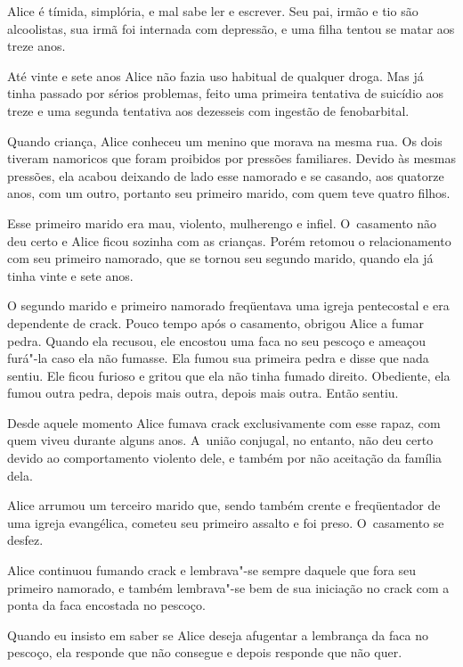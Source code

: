  

Alice é tímida, simplória, e mal sabe ler e escrever. Seu pai, irmão e
tio são alcoolistas, sua irmã foi internada com depressão, e uma filha
tentou se matar aos treze anos.

Até vinte e sete anos Alice não fazia uso habitual de qualquer droga.
Mas já tinha passado por sérios problemas, feito uma primeira tentativa
de suicídio aos treze e uma segunda tentativa aos dezesseis com ingestão
de fenobarbital.

Quando criança, Alice conheceu um menino que morava na mesma rua. Os
dois tiveram namoricos que foram proibidos por pressões familiares.
Devido às mesmas pressões, ela acabou deixando de lado esse namorado e
se casando, aos quatorze anos, com um outro, portanto seu primeiro
marido, com quem teve quatro filhos.

Esse primeiro marido era mau, violento, mulherengo e infiel. O~casamento
não deu certo e Alice ficou sozinha com as crianças. Porém retomou o
relacionamento com seu primeiro namorado, que se tornou seu segundo
marido, quando ela já tinha vinte e sete anos.

O segundo marido e primeiro namorado freqüentava uma igreja pentecostal
e era dependente de crack. Pouco tempo após o casamento, obrigou Alice a
fumar pedra. Quando ela recusou, ele encostou uma faca no seu pescoço e
ameaçou furá"-la caso ela não fumasse. Ela fumou sua primeira pedra e
disse que nada sentiu. Ele ficou furioso e gritou que ela não tinha
fumado direito. Obediente, ela fumou outra pedra, depois mais outra,
depois mais outra. Então sentiu.

Desde aquele momento Alice fumava crack exclusivamente com esse rapaz,
com quem viveu durante alguns anos. A~união conjugal, no entanto, não
deu certo devido ao comportamento violento dele, e também por não
aceitação da família dela.

Alice arrumou um terceiro marido que, sendo também crente e freqüentador
de uma igreja evangélica, cometeu seu primeiro assalto e foi preso. O~casamento se desfez.

Alice continuou fumando crack e lembrava"-se sempre daquele que fora seu
primeiro namorado, e também lembrava"-se bem de sua iniciação no crack
com a ponta da faca encostada no pescoço.

Quando eu insisto em saber se Alice deseja afugentar a lembrança da faca
no pescoço, ela responde que não consegue e depois responde que não
quer.

